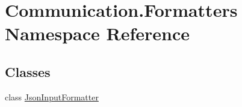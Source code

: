 \hypertarget{namespace_communication_1_1_formatters}{}\section{Communication.\+Formatters Namespace Reference}
\label{namespace_communication_1_1_formatters}
\subsection*{Classes}
\begin{DoxyCompactItemize}
\item 
class \mbox{\hyperlink{class_communication_1_1_formatters_1_1_json_input_formatter}{Json\+Input\+Formatter}}
\end{DoxyCompactItemize}
